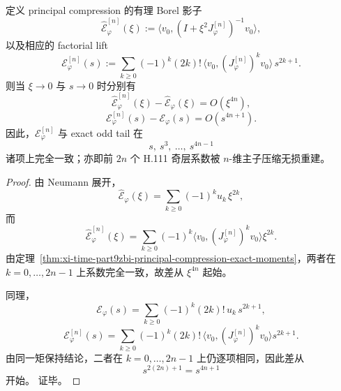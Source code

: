 \begin{corollary}\label{cor:xi-time-part9zbi-principal-compression-odd-tail-reconstruction}
定义 principal compression 的有理 Borel 影子
\[
\widehat{\mathcal E}_\varphi^{[n]}(\xi)
:=
\langle v_0,(I+\xi^2J_\varphi^{[n]})^{-1}v_0\rangle,
\]
以及相应的 factorial lift
\[
\mathcal E_\varphi^{[n]}(s)
:=
\sum_{k\ge 0}
(-1)^k(2k)!\,
\langle v_0,(J_\varphi^{[n]})^k v_0\rangle\,
s^{2k+1}.
\]
则当 \(\xi\to 0\) 与 \(s\to 0\) 时分别有
\[
\widehat{\mathcal E}_\varphi^{[n]}(\xi)-\widehat{\mathcal E}_\varphi(\xi)
=
O(\xi^{4n}),
\]
\[
\mathcal E_\varphi^{[n]}(s)-\mathcal E_\varphi(s)
=
O(s^{4n+1}).
\]
因此，\(\mathcal E_\varphi^{[n]}\) 与 exact odd tail 在
\[
s,\ s^3,\ \dots,\ s^{4n-1}
\]
诸项上完全一致；亦即前 \(2n\) 个 H.111 奇层系数被 \(n\)-维主子压缩无损重建。
\end{corollary}
\begin{proof}
由 Neumann 展开，
\[
\widehat{\mathcal E}_\varphi(\xi)
=
\sum_{k\ge 0}(-1)^k u_k\,\xi^{2k},
\]
而
\[
\widehat{\mathcal E}_\varphi^{[n]}(\xi)
=
\sum_{k\ge 0}
(-1)^k
\langle v_0,(J_\varphi^{[n]})^k v_0\rangle
\xi^{2k}.
\]
由定理~\ref{thm:xi-time-part9zbi-principal-compression-exact-moments}，两者在 \(k=0,\dots,2n-1\) 上系数完全一致，故差从 \(\xi^{4n}\) 起始。

同理，
\[
\mathcal E_\varphi(s)
=
\sum_{k\ge 0}(-1)^k(2k)!\,u_k\,s^{2k+1},
\]
\[
\mathcal E_\varphi^{[n]}(s)
=
\sum_{k\ge 0}
(-1)^k(2k)!\,
\langle v_0,(J_\varphi^{[n]})^k v_0\rangle
s^{2k+1}.
\]
由同一矩保持结论，二者在 \(k=0,\dots,2n-1\) 上仍逐项相同，因此差从
\[
s^{2(2n)+1}=s^{4n+1}
\]
开始。
证毕。
\end{proof}

